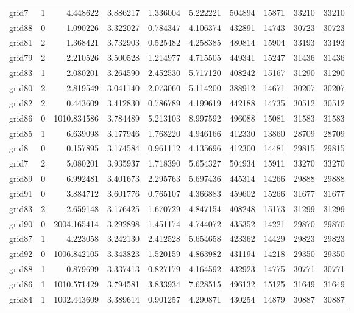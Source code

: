 \documentclass[../../../thesis.tex]{subfiles}
\begin{document}
\begin{longtable}{|l|r|r|r|r|r|r|r|r|r|}
grid7 & 1 & 4.448622 & 3.886217 & 1.336004 & 5.222221 & 504894 & 15871 & 33210 & 33210 \\
grid88 & 0 & 1.090226 & 3.322027 & 0.784347 & 4.106374 & 432891 & 14743 & 30723 & 30723 \\
grid81 & 2 & 1.368421 & 3.732903 & 0.525482 & 4.258385 & 480814 & 15904 & 33193 & 33193 \\
grid79 & 2 & 2.210526 & 3.500528 & 1.214977 & 4.715505 & 449341 & 15247 & 31436 & 31436 \\
grid83 & 1 & 2.080201 & 3.264590 & 2.452530 & 5.717120 & 408242 & 15167 & 31290 & 31290 \\
grid80 & 2 & 2.819549 & 3.041140 & 2.073060 & 5.114200 & 388912 & 14671 & 30207 & 30207 \\
grid82 & 2 & 0.443609 & 3.412830 & 0.786789 & 4.199619 & 442188 & 14735 & 30512 & 30512 \\
grid86 & 0 & 1010.834586 & 3.784489 & 5.213103 & 8.997592 & 496088 & 15081 & 31583 & 31583 \\
grid85 & 1 & 6.639098 & 3.177946 & 1.768220 & 4.946166 & 412330 & 13860 & 28709 & 28709 \\
grid8 & 0 & 0.157895 & 3.174584 & 0.961112 & 4.135696 & 412300 & 14481 & 29815 & 29815 \\
grid7 & 2 & 5.080201 & 3.935937 & 1.718390 & 5.654327 & 504934 & 15911 & 33270 & 33270 \\
grid89 & 0 & 6.992481 & 3.401673 & 2.295763 & 5.697436 & 445314 & 14266 & 29888 & 29888 \\
grid91 & 0 & 3.884712 & 3.601776 & 0.765107 & 4.366883 & 459602 & 15266 & 31677 & 31677 \\
grid83 & 2 & 2.659148 & 3.176425 & 1.670729 & 4.847154 & 408248 & 15173 & 31299 & 31299 \\
grid90 & 0 & 2004.165414 & 3.292898 & 1.451174 & 4.744072 & 435352 & 14221 & 29870 & 29870 \\
grid87 & 1 & 4.223058 & 3.242130 & 2.412528 & 5.654658 & 423362 & 14429 & 29823 & 29823 \\
grid92 & 0 & 1006.842105 & 3.343823 & 1.520159 & 4.863982 & 431194 & 14218 & 29350 & 29350 \\
grid88 & 1 & 0.879699 & 3.337413 & 0.827179 & 4.164592 & 432923 & 14775 & 30771 & 30771 \\
grid86 & 1 & 1010.571429 & 3.794581 & 3.833934 & 7.628515 & 496132 & 15125 & 31649 & 31649 \\
grid84 & 1 & 1002.443609 & 3.389614 & 0.901257 & 4.290871 & 430254 & 14879 & 30887 & 30887 \\

\end{longtable}
\end{document}
